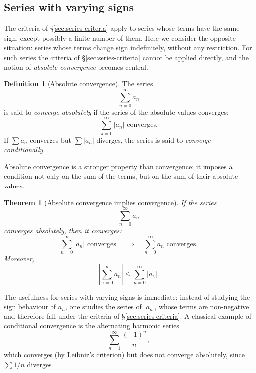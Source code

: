 \documentclass[11pt,a4paper]{article}
\theoremstyle{definition} \newtheorem{definition}{Definition} \theoremstyle{plain} \newtheorem{theorem}{Theorem}
\begin{document}
\subsection{Series with varying signs}
The criteria of \S\ref{sec:series-criteria} apply to series whose terms have the same sign, except possibly a finite number of them.
Here we consider the opposite situation: series whose terms change sign indefinitely, without any restriction.
For such series the criteria of \S\ref{sec:series-criteria} cannot be applied directly, and the notion of \emph{absolute convergence} becomes central.
\begin{definition}[Absolute convergence] The series
\[ \sum_{n=0}^{\infty} a_n \]
is said to \emph{converge absolutely} if the series of the absolute values converges:
\[ \sum_{n=0}^{\infty} |a_n| \text{ converges}. \]
If $\sum a_n$ converges but $\sum |a_n|$ diverges, the series is said to \emph{converge conditionally}. \end{definition}
Absolute convergence is a stronger property than convergence: it imposes a condition not only on the sum of the terms, but on the sum of their absolute values.
\begin{theorem}[Absolute convergence implies convergence]\label{thm:absolute-convergence} If the series
\[ \sum_{n=0}^{\infty} a_n \]
converges absolutely, then it converges:
\[ \sum_{n=0}^{\infty} |a_n| \text{ converges } \quad\Longrightarrow\quad \sum_{n=0}^{\infty} a_n \text{ converges}. \]
Moreover,
\[ \left|\sum_{n=0}^{\infty} a_n\right| \le \sum_{n=0}^{\infty} |a_n|. \]
\end{theorem}
The usefulness for series with varying signs is immediate: instead of studying the sign behaviour of $a_n$, one studies the series of $|a_n|$, whose terms are non-negative and therefore fall under the criteria of \S\ref{sec:series-criteria}.
A classical example of conditional convergence is the alternating harmonic series
\[ \sum_{n=1}^{\infty} \frac{(-1)^n}{n}, \]
which converges (by Leibniz's criterion) but does not converge absolutely, since $\sum 1/n$ diverges.
\end{document}
